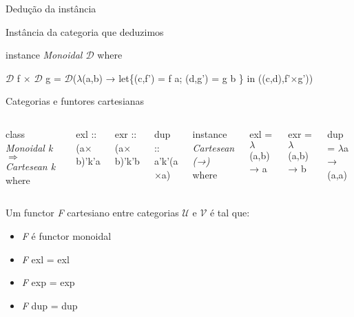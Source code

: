 \documentclass{beamer}
\begin{document}
\begin{frame}{Dedução da instância}

\begin{block}{Instância da categoria que deduzimos}

instance \textit{Monoidal $\mathcal{D}$} where

\hspace{0.2cm}$\mathcal{D}$ f $\times$ $\mathcal{D}$ g = $\mathcal{D}$($\lambda$(a,b) → let\{(c,f') = f a; (d,g') =  g b \} in ((c,d),f'$\times$g'))

\end{block}

\end{frame}



\begin{frame}{Categorias e funtores cartesianas}

\begin{block}

\begin{columns}
 
class \textit{Monoidal k} $\Rightarrow$ \textit{Cartesean k} where

\hspace{0.2cm}exl :: (a$\times$b)'k'a

\hspace{0.2cm}exr :: (a$\times$b)'k'b

\hspace{0.2cm}dup :: a'k'(a$\times$a)
 
instance \textit{Cartesean (→)} where

\hspace{0.2cm}exl = $\lambda$(a,b) → a

\hspace{0.2cm}exr = $\lambda$(a,b) → b

\hspace{0.2cm}dup = $\lambda$a → (a,a)

\end{columns}

\end{block}


\begin{block}


Um functor \textit{F} cartesiano entre categorias $\mathcal{U}$ e $\mathcal{V}$ é tal que:
\begin{itemize}
    \item \textit{F} é functor monoidal
    \item \textit{F} exl = exl
    \item \textit{F} exp = exp
    \item \textit{F} dup = dup
\end{itemize}


\end{block}


\end{frame}
\end{document}
